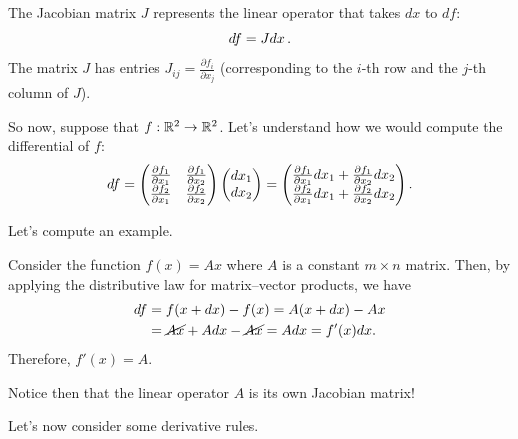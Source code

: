 The Jacobian matrix $J$
represents the linear operator that takes $dx$ to $df$:
\[
d f = J d x \, .
\]
The matrix $J$ has entries $J_{ij}=\frac{\partial f_i}{\partial x_j}$ (corresponding to the $i$-th row and the $j$-th column of $J$).

So now, suppose that $f: \mathbb R^2 \to \mathbb R^2$. Let's understand how we would compute the differential of $f$:
\[
d f = \begin{pmatrix}
   \frac{\partial f_1}{\partial x_1} & \frac{\partial f_1}{\partial x_2} \\ \frac{\partial f_2}{\partial x_1} & \frac{\partial f_2}{\partial x_2}
\end{pmatrix} \begin{pmatrix}
     d x_1 \\ d x_2
\end{pmatrix} = \begin{pmatrix}
    \frac{\partial f_1}{\partial x_1}d x_1 +  \frac{\partial f_1}{\partial x_2}d x_2 \\ \frac{\partial f_2}{\partial x_1}d x_1 +  \frac{\partial f_2}{\partial x_2} d x_2
\end{pmatrix}.
\]

Let's compute an example.
\begin{example}\label{ex1}
    Consider the function $f(x) = Ax$ where $A$ is a constant $m\times n$ matrix. Then, by applying the distributive law for matrix--vector products, we have
\begin{align*}
    d f &= f(x+d x ) - f(x) =  A(x + d x) - Ax  \\
    &= \cancel{Ax} + Ad x - \cancel{Ax} = Ad x = f'(x) d x.
\end{align*}
Therefore, $f'(x) = A$.
\end{example}

Notice then that the linear operator $A$ is its own Jacobian matrix!

Let's now consider some derivative rules.

